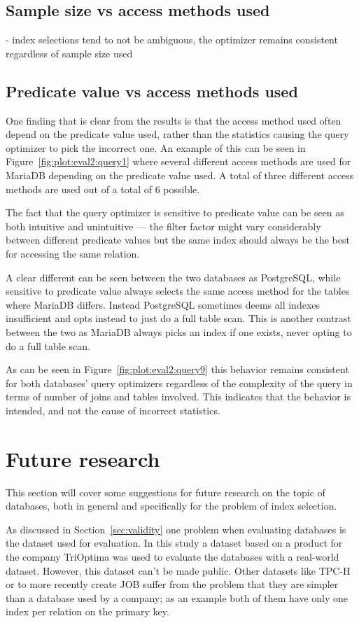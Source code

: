 \subsection{Sample size vs access methods used}
- index selections tend to not be ambiguous, the optimizer remains consistent regardless of sample size used

\subsection{Predicate value vs access methods used}
One finding that is clear from the results is that the access method used often
depend on the predicate value used, rather than the statistics causing the query
optimizer to pick the incorrect one. An example of this can be seen in
Figure~\ref{fig:plot:eval2:query1} where several different access methods are
used for MariaDB depending on the predicate value used. A total of three
different access methods are used out of a total of 6 possible.

The fact that the query optimizer is sensitive to predicate value can be seen as
both intuitive and unintuitive --- the filter factor might vary considerably
between different predicate values but the same index should always be the best
for accessing the same relation.

A clear different can be seen between the two databases as PostgreSQL, while
sensitive to predicate value always selects the same access method for the
tables where MariaDB differs. Instead PostgreSQL sometimes deems all indexes
insufficient and opts instead to just do a full table scan. This is another
contrast between the two as MariaDB always picks an index if one exists, never
opting to do a full table scan.

As can be seen in Figure~\ref{fig:plot:eval2:query9} this behavior remains
consistent for both databases' query optimizers regardless of the complexity of
the query in terms of number of joins and tables involved. This indicates that
the behavior is intended, and not the cause of incorrect statistics.

\section{Future research}
This section will cover some suggestions for future research on the topic of
databases, both in general and specifically for the problem of index selection.

As discussed in Section~\ref{sec:validity} one problem when evaluating
databases is the dataset used for evaluation. In this study a dataset based on a
product for the company TriOptima was used to evaluate the databases with a real-world
dataset. However, this dataset can't be made public. Other datasets like TPC-H
or to more recently create JOB suffer from the problem that they are simpler
than a database used by a company; as an example both of them have only one
index per relation on the primary key.

